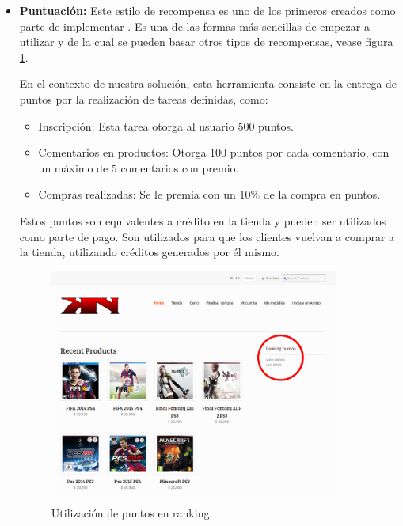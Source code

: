 \begin{itemize}
    \item {\bf Puntuación:}
	Este estilo de recompensa es uno de los primeros creados como parte de
	implementar {\gam}. Es una de las formas más sencillas de empezar
 	a utilizar {\gam}\cite{OnlineComp} y de la cual se pueden basar 
	otros tipos de recompensas,
	vease figura \ref{fig:ranking}.

        En el contexto de nuestra solución, esta herramienta consiste en la entrega de
	puntos por la realización de tareas definidas, como:

    \begin{itemize}
        \item Inscripción:
            Esta tarea otorga al usuario 500 puntos.
        \item Comentarios en productos:
            Otorga 100 puntos por cada comentario, con un máximo de 5 comentarios
            con premio.
        \item Compras realizadas:
            Se le premia con un 10\% de la compra en puntos.
    \end{itemize}

        Estos puntos son equivalentes a crédito en la tienda y pueden ser
        utilizados como parte de pago.
        Son utilizados para que los clientes vuelvan a comprar a la tienda,
        utilizando créditos generados por él mismo.

\begin{figure}[!htb]
  \centering
  \includegraphics[width=0.9\textwidth]{images/Tienda/Tienda_ranking.png}
  \caption[Ranking puntos]{Utilización de puntos en ranking.}
  \label{fig:ranking}
\end{figure}



\end{itemize}
